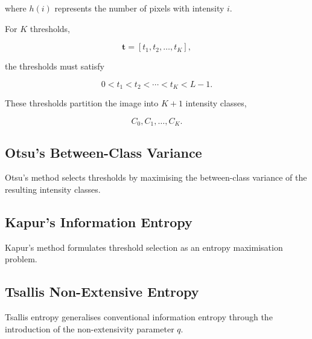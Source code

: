\documentclass[review]{elsarticle}
\begin{document}
where $h(i)$ represents the number of pixels with intensity $i$.

For $K$ thresholds,

\begin{equation}
\mathbf{t} =
[t_1,t_2,\ldots,t_K],
\end{equation}

the thresholds must satisfy

\begin{equation}
0 < t_1 < t_2 < \cdots < t_K < L-1.
\end{equation}

These thresholds partition the image into $K+1$ intensity classes,

\begin{equation}
C_0,C_1,\ldots,C_K.
\end{equation}


\subsection{Otsu's Between-Class Variance}
\label{sec:otsu}

%

Otsu's method selects thresholds by maximising the between-class
variance of the resulting intensity classes.



\subsection{Kapur's Information Entropy}
\label{sec:kapur}

Kapur's method formulates threshold selection as an entropy maximisation
problem.



\subsection{Tsallis Non-Extensive Entropy}
\label{sec:tsallis}

Tsallis entropy generalises conventional information entropy through
the introduction of the non-extensivity parameter $q$.
\end{document}
